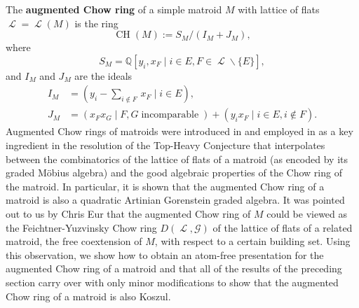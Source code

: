 \documentclass[11pt, reqno]{amsart}
\DeclareMathOperator{\aChow}{CH}             		%
\DeclareMathOperator{\LL}{\mathcal{L}}
\newcommand{\QQ}{\mathbb{Q}}
\renewcommand{\setminus}{\smallsetminus}
\newcommand{\term}[1]{\textbf{\textsf{#1}}}
\theoremstyle{definition}
\numberwithin{equation}{section}
\numberwithin{table}{section}
\begin{document}
\begin{spacing}{1.1}
The \term{augmented Chow ring} of a simple matroid $M$ with lattice of flats $\LL = \LL(M)$  is the ring
\[\aChow(M) := S_M/(I_M + J_M),\]
where
\[S_M = \QQ[y_i, x_F \mid i \in E, F \in \LL \setminus \{E\} ],\]
and $I_M$ and $J_M$ are the ideals
\begin{align*}
I_M &= (y_i - \textstyle \sum_{i \notin F} \, x_F \mid i \in E ),\\[1 ex]
J_M &= (x_Fx_G \mid F,G \;\text{incomparable}\;) + (y_ix_F \mid i \in E, i \notin F).
\end{align*}
Augmented Chow rings of matroids were introduced in \cite{BHMPW20a} and employed in \cite{BHMPW20b} as a key ingredient in the resolution of the Top-Heavy Conjecture that interpolates between the combinatorics of the lattice of flats of a matroid (as encoded by its graded M\"obius algebra) and the good algebraic properties of the Chow ring of the matroid.  In particular, it is shown \cite[Theorem 2.19]{BHMPW20b} that the augmented Chow ring of a matroid is also a quadratic Artinian Gorenstein graded algebra.  It was pointed out to us by Chris Eur that the augmented Chow ring of $M$ could be viewed as the Feichtner-Yuzvinsky Chow ring $D(\LL, \mathcal{G})$ of the lattice of flats of a related matroid, the free coextension of $M$, with respect to a certain building set.  Using this observation, we show how to obtain an atom-free presentation for the augmented Chow ring of a matroid and that all of the results of the preceding section carry over with only minor modifications to show that the augmented Chow ring of a matroid is also Koszul.


\end{spacing}
\end{document}
